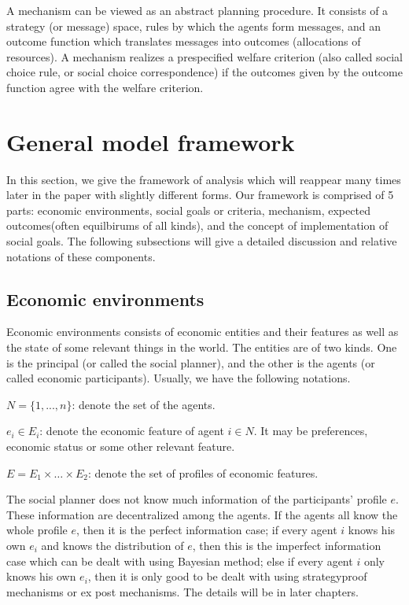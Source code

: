 A mechanism can be viewed as an abstract planning procedure. It consists of a strategy (or message)
space, rules by which the agents form messages, and an
outcome function which translates messages into outcomes (allocations of resources). A mechanism
realizes a prespecified welfare criterion (also called social choice rule, or social
choice correspondence) if the outcomes given by the outcome function agree with the welfare
criterion. 

\section{General model framework}
 In this section, we give the framework of analysis which will
 reappear many times later in the paper with slightly different
 forms. Our framework is comprised of 5 parts: 
 economic environments, social goals or criteria,  mechanism, 
expected outcomes(often equilbirums of all kinds), and the concept of
implementation of social goals.
The following subsections will give a detailed discussion and relative
notations of these components.
\subsection{Economic environments}
Economic environments consists of economic entities and their features
as well as the state of some relevant things in the world. The
entities are of two kinds. One is the principal (or called the social
planner),  and the other is  the agents (or called economic
participants).  Usually, we have the following notations.

$N=\{1,...,n\}$: denote the set of the agents.

$e_i\in E_i$: denote the economic feature of agent $i\in N$. It may be preferences, economic status or some other relevant feature.

$E=E_1\times \dots \times E_2$: denote the set of profiles of economic features.

 The social planner does not know much information of
the participants' profile $e$. These information are decentralized
among the agents. 
If the agents all know the whole profile $e$, then it is the perfect information case; if every agent $i$ knows his own $e_i$ and knows the distribution of $e$, then this is the imperfect information case which can be dealt with using Bayesian method; else if every agent $i$ only knows his own $e_i$, then it is only good to be dealt with using strategyproof mechanisms or ex post mechanisms. The details will be in later chapters.

